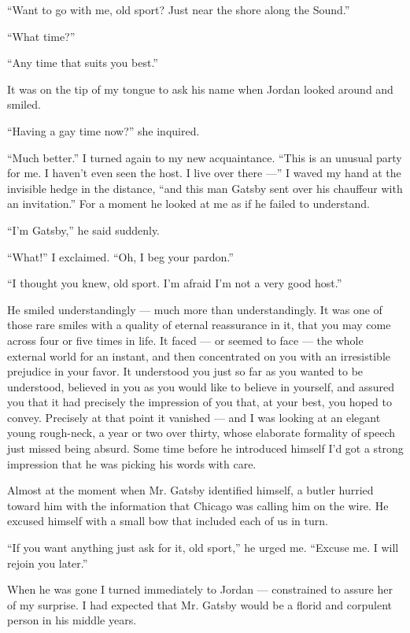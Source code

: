 \documentclass{znotebook}
\begin{document}
``Want to go with me, old sport? Just near the shore along the Sound.''

``What time?''

``Any time that suits you best.''

It was on the tip of my tongue to ask his name when Jordan looked around and smiled.

``Having a gay time now?'' she inquired.

``Much better.'' I turned again to my new acquaintance. ``This is an unusual party for me. I haven't even seen the host. I live over there ---'' I waved my hand at the invisible hedge in the distance, ``and this man Gatsby sent over his chauffeur with an invitation.'' For a moment he looked at me as if he failed to understand.

``I'm Gatsby,'' he said suddenly.

``What!'' I exclaimed. ``Oh, I beg your pardon.''

``I thought you knew, old sport. I'm afraid I'm not a very good host.''

He smiled understandingly ---{} much more than understandingly. It was one of those rare smiles with a quality of eternal reassurance in it, that you may come across four or five times in life. It faced ---{} or seemed to face ---{} the whole external world for an instant, and then concentrated on you with an irresistible prejudice in your favor. It understood you just so far as you wanted to be understood, believed in you as you would like to believe in yourself, and assured you that it had precisely the impression of you that, at your best, you hoped to convey. Precisely at that point it vanished ---{} and I was looking at an elegant young rough-neck, a year or two over thirty, whose elaborate formality of speech just missed being absurd. Some time before he introduced himself I'd got a strong impression that he was picking his words with care.

Almost at the moment when Mr. Gatsby identified himself, a butler hurried toward him with the information that Chicago was calling him on the wire. He excused himself with a small bow that included each of us in turn.

``If you want anything just ask for it, old sport,'' he urged me. ``Excuse me. I will rejoin you later.''

When he was gone I turned immediately to Jordan ---{} constrained to assure her of my surprise. I had expected that Mr. Gatsby would be a florid and corpulent person in his middle years.
\end{document}
